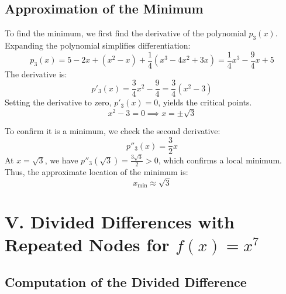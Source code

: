\documentclass[a4paper]{article}
\begin{document}
\subsection*{Approximation of the Minimum}

To find the minimum, we first find the derivative of the polynomial $p_3(x)$. Expanding the polynomial simplifies differentiation:
\[
p_3(x) = 5 - 2x + (x^2 - x) + \frac{1}{4}(x^3 - 4x^2 + 3x) = \frac{1}{4}x^3 - \frac{9}{4}x + 5
\]
The derivative is:
\[
p'_3(x) = \frac{3}{4}x^2 - \frac{9}{4} = \frac{3}{4}(x^2 - 3)
\]
Setting the derivative to zero, $p'_3(x) = 0$, yields the critical points.
\[
x^2 - 3 = 0 \implies x = \pm\sqrt{3}
\]

To confirm it is a minimum, we check the second derivative:
\[
p''_3(x) = \frac{3}{2}x
\]
At $x = \sqrt{3}$, we have $p''_3(\sqrt{3}) = \frac{3\sqrt{3}}{2} > 0$, which confirms a local minimum.
Thus, the approximate location of the minimum is:
\[
x_{\min} \approx \sqrt{3}
\]



\section*{V. Divided Differences with Repeated Nodes for $f(x)=x^7$}

\subsection*{Computation of the Divided Difference}
\end{document}
